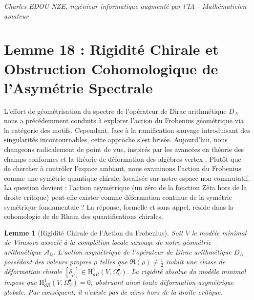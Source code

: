 \documentclass[
]{article}
\newtheorem{lemma}{Lemme}
\begin{document}
\vspace{1cm}
\begin{flushright}
\textit{Charles EDOU NZE, ingénieur informatique augmenté par l'IA - Mathématicien amateur}
\end{flushright}


\section{Lemme 18 : Rigidité Chirale et Obstruction Cohomologique de l'Asymétrie Spectrale}

L'effort de géométrisation du spectre de l'opérateur de Dirac arithmétique $D_A$ nous a précédemment conduits à explorer l'action du Frobenius géométrique via la catégorie des motifs. Cependant, face à la ramification sauvage introduisant des singularités incontournables, cette approche s'est brisée. Aujourd'hui, nous changeons radicalement de point de vue, inspirés par les avancées en théorie des champs conformes et la théorie de déformation des algèbres vertex \cite{butson2026}. Plutôt que de chercher à contrôler l'espace ambiant, nous examinons l'action du Frobenius comme une symétrie quantique chirale, localisée sur notre espace non commutatif. La question devient : l'action asymétrique (un zéro de la fonction Zêta hors de la droite critique) peut-elle exister comme déformation continue de la symétrie symétrique fondamentale ? La réponse, formelle et sans appel, réside dans la cohomologie de de Rham des quantifications chirales.

\begin{lemma}[Rigidité Chirale de l'Action du Frobenius]
\label{lem:rigidite_chirale}
Soit $V$ le modèle minimal de Virasoro associé à la complétion locale sauvage de notre géométrie arithmétique $\mathcal{A}_{\mathbb{Q}}$. L'action asymétrique de l'opérateur de Dirac arithmétique $D_A$ possédant des valeurs propres $\rho$ telles que $\Re(\rho) \neq \frac{1}{2}$ induit une classe de déformation chirale $[\delta_{\rho}] \in \mathrm{H}_{dR}^1(V, \Omega^\bullet_V)$. La rigidité absolue du modèle minimal impose que $\mathrm{H}_{dR}^1(V, \Omega^\bullet_V) = 0$, obstruant ainsi toute déformation asymétrique globale. Par conséquent, il n'existe pas de zéros hors de la droite critique.
\end{lemma}
\end{document}
